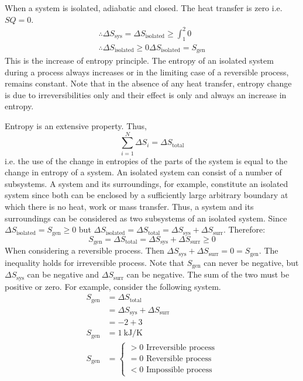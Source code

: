 \documentclass[class=report, crop=false, 12pt,a4paper]{standalone}
\numberwithin{equation}{section}
\begin{document}
When a system is isolated, adiabatic and closed. The heat transfer is zero i.e. \(SQ = 0\).
\begin{align}
  \therefore \Delta S_{\textrm{sys}} = \Delta S_{\textrm{isolated}} \geq \int_1^2 0 \\
  \therefore \Delta S_{\textrm{isolated}} \geq 0
  \Delta S_{\textrm{isolated}} = S_{\textrm{gen}}
\end{align}
This is the increase of entropy principle. The entropy of an isolated system during a process always increases or in the limiting case of a reversible process, remains constant. Note that in the absence of any heat transfer, entropy change is due to irreversibilities only and their effect is only and always an increase in entropy.

Entropy is an extensive property. Thus, 
\begin{equation}
  \sum^N_{i=1} \Delta S_i = \Delta S_{\textrm{total}}
\end{equation}
i.e. the use of the change in entropies of the parts of the system is equal to the change in entropy of a system. An isolated system can consist of a number of subsystems. A system and its surroundings, for example, constitute an isolated system since both can be enclosed by a sufficiently large arbitrary boundary at which there is no heat, work or mass transfer. Thus, a system and its surroundings can be considered as two subsystems of an isolated system. Since \( \Delta S_{\textrm{isolated}} = S_{\textrm{gen}} \geq 0 \) but \( \Delta S_{\textrm{isolated}} = \Delta S_{\textrm{total}} = \Delta S_{\textrm{sys}} + \Delta S_{\textrm{surr}} \). Therefore:
\begin{equation} 
  S_{\textrm{gen}} = \Delta S_{\textrm{total}} = \Delta S_{\textrm{sys}} + \Delta S_{\textrm{surr}} \geq 0 
\end{equation}
When considering a reversible process. Then \( \Delta S_{\textrm{sys}} + \Delta S_{\textrm{surr}} = 0 = S_{\textrm{gen}} \). The inequality holds for irreversible process. Note that \( S_{\textrm{gen}}\) can never be negative, but \( \Delta S_{\textrm{sys}} \) can be negative and \( \Delta S_{\textrm{surr}} \) can be negative. The sum of the two must be positive or zero. For example, consider the following system. 
\begin{align} 
  S_{\textrm{gen}} &= \Delta S_{\textrm{total}} \\
  &= \Delta S_{\textrm{sys}} + \Delta S_{\textrm{surr}}\\
  &= -2 + 3 \\
  S_{\textrm{gen}} &= 1 \ \si{\kilo\joule\per\kelvin} \\
  S_{\textrm{gen}} &= \begin{cases}
  > 0 \textrm{ Irreversible process}\\
  = 0 \textrm{ Reversible process}\\
  < 0 \textrm{ Impossible process}
  \end{cases}
\end{align}
\end{document}

